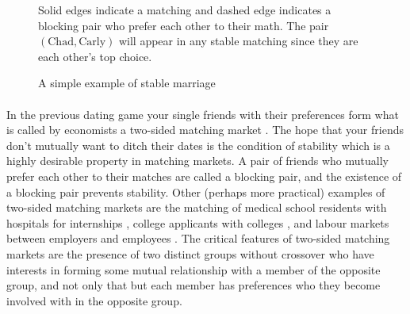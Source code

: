\begin{figure}
\centering
{}
\caption{A simple example of stable marriage}
\small
\begin{flushleft}
Solid edges indicate a matching and dashed edge indicates a blocking pair who prefer each other to their math. The pair $(\text{Chad},\text{Carly})$ will appear in any stable matching since they are each other's top choice.
\end{flushleft}
\end{figure}

\paragraph{}
In the previous dating game your single friends with their preferences form what is called by economists a two-sided matching market \cite{roth1992two}. The hope that your friends don't mutually want to ditch their dates is the condition of stability which is a highly desirable property in matching markets. A pair of friends who mutually prefer each other to their matches are called a blocking pair, and the existence of a blocking pair prevents stability. Other (perhaps more practical) examples of two-sided matching markets are the matching of medical school residents with hospitals for internships \cite{roth1996nrmp}, college applicants with colleges \cite{gale1962college}, and labour markets between employers and employees \cite{roth1992two}. The critical features of two-sided matching markets are the presence of two distinct groups without crossover who have interests in forming some mutual relationship with a member of the opposite group, and not only that but each member has preferences who they become involved with in the opposite group.

